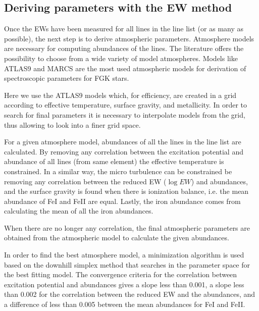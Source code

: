 \documentclass{aa}
\begin{document}
\subsection{Deriving parameters with the EW method}
\label{sec:deriving_parameters_with_the_ew_method}

Once the EWs have been measured for all lines in the line list (or as
many as possible), the next step is to derive atmospheric parameters.
Atmosphere models are necessary for computing abundances of the lines.
The literature offers the possibility to choose from a wide variety
of model atmospheres. Models like ATLAS9 \citep{Kurucz1993} and
MARCS \citep{Gustafson2008} are the most used atmospheric models for
derivation of spectroscopic parameters for FGK stars.

Here we use the ATLAS9 models which, for efficiency, are created
in a grid according to effective temperature, surface gravity, and
metallicity. In order to search for final parameters it is necessary to
interpolate models from the grid, thus allowing to look into a finer
grid space.

For a given atmosphere model, abundances of all the lines in the line
list are calculated. By removing any correlation between the excitation
potential and abundance of all lines (from same element) the effective
temperature is constrained. In a similar way, the micro turbulence can
be constrained be removing any correlation between the reduced EW ($\log
EW$) and abundances, and the surface gravity is found when there is
ionization balance, i.e. the mean abundance of FeI and FeII are equal.
Lastly, the iron abundance comes from calculating the mean of
all the iron abundances.

When there are no longer any correlation, the final atmospheric
parameters are obtained from the atmospheric model to calculate the
given abundances.

In order to find the best atmosphere model, a minimization algorithm
is used based on the downhill simplex method \citep{Press1992} that
searches in the parameter space for the best fitting model. The
convergence criteria for the correlation between excitation potential
and abundances gives a slope less than 0.001, a slope less than 0.002
for the correlation between the reduced EW and the abundances, and a
difference of less than 0.005 between the mean abundances for FeI and
FeII.
\end{document}
